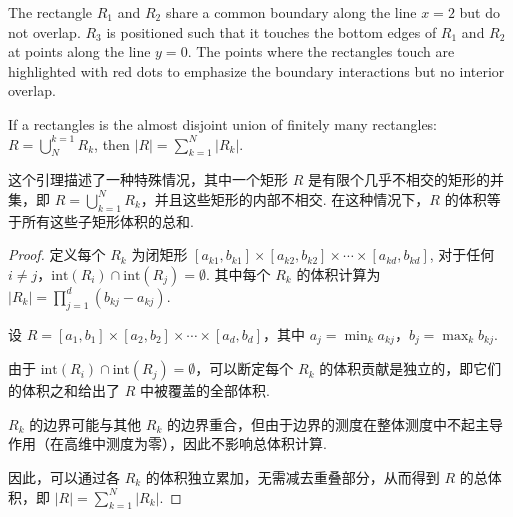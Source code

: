 \documentclass[UTF8,12pt,AutoFakeBold]{ctexbook}
\numberwithin{equation}{section}
\begin{document}
	\begin{figure}[H]
		\centering
	\end{figure}
	The rectangle $R_1$ and $R_2$ share a common boundary along the line $x=2$ but do not overlap. $R_3$ is positioned such that it touches the bottom edges of $R_1$ and $R_2$ at points along the line $y=0$. The points where the rectangles touch are highlighted with red dots to emphasize the boundary interactions but no interior overlap.
	\begin{lemma}
		If a rectangles is the almost disjoint union of finitely many rectangles: $R=\bigcup_{N}^{k=1} R_k $, then $\left | R \right |=\sum_{k=1}^{N}\left | R_k \right |$.
	\end{lemma}
	这个引理描述了一种特殊情况，其中一个矩形 \( R \) 是有限个几乎不相交的矩形的并集，即 \( R=\bigcup_{k=1}^N R_k \)，并且这些矩形的内部不相交. 在这种情况下，\( R \) 的体积等于所有这些子矩形体积的总和.
	\begin{proof}
		定义每个 \( R_k \) 为闭矩形 \([a_{k1}, b_{k1}] \times [a_{k2}, b_{k2}] \times \cdots \times [a_{kd}, b_{kd}]\), 对于任何 \( i \neq j \)，\( \text{int}(R_i) \cap \text{int}(R_j) = \emptyset \). 其中每个 \( R_k \) 的体积计算为 \( |R_k| = \prod_{j=1}^d (b_{kj} - a_{kj}) \).
		
		设 \( R = [a_1, b_1] \times [a_2, b_2] \times \cdots \times [a_d, b_d] \)，其中 \( a_j = \min_k a_{kj} \)，\( b_j = \max_k b_{kj} \).
		
		由于 \( \text{int}(R_i) \cap \text{int}(R_j) = \emptyset \)，可以断定每个 \( R_k \) 的体积贡献是独立的，即它们的体积之和给出了 \( R \) 中被覆盖的全部体积.
		
		\( R_k \) 的边界可能与其他 \( R_k \) 的边界重合，但由于边界的测度在整体测度中不起主导作用（在高维中测度为零），因此不影响总体积计算.
		
		因此，可以通过各 \( R_k \) 的体积独立累加，无需减去重叠部分，从而得到 \( R \) 的总体积，即 \( |R| = \sum_{k=1}^N |R_k| \).
	\end{proof}
	
\end{document}
